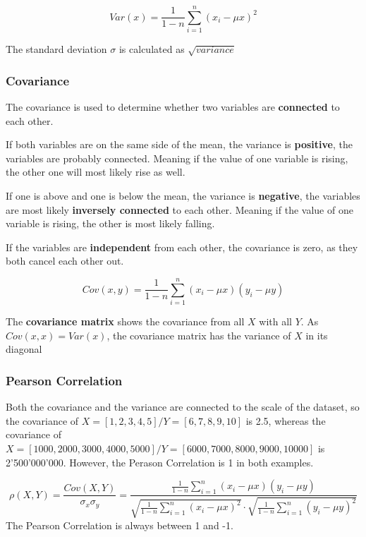 \documentclass[11pt]{article}
\begin{document}
\begin{equation}
    Var(x) = \frac{1}{1-n} \sum^{n}_{i=1}(x_{i} - \mu x)^2
\end{equation}

The standard deviation $\sigma$ is calculated as $\sqrt{variance}$

\newpage

\subsubsection{Covariance} \label{sec:covariance}
The covariance is used to determine whether two variables are \textbf{connected} to each other.

If both variables are on the same side of the mean, the variance is \textbf{positive}, the variables are probably connected. Meaning if the value of one variable is rising, the other one will most likely rise as well.

If one is above and one is below the mean, the variance is \textbf{negative}, the variables are most likely \textbf{inversely connected} to each other. Meaning if the value of one variable is rising, the other is most likely falling.

If the variables are \textbf{independent} from each other, the covariance is zero, as they both cancel each other out.

\begin{equation}
    Cov(x,y) = \frac{1}{1-n} \sum^{n}_{i=1}(x_{i} - \mu x)(y_{i} - \mu y)
\end{equation}

The \textbf{covariance matrix} shows the covariance from all $X$ with all $Y$. As $Cov(x,x) = Var(x)$, the covariance matrix has the variance of $X$ in its diagonal


\subsubsection{Pearson Correlation} \label{sec:pearson}
Both the covariance and the variance are connected to the scale of the dataset, so the covariance of $X=[1,2,3,4,5] / Y=[6,7,8,9,10]$ is 2.5, whereas the covariance of $X=[1000,2000,3000,4000,5000] / Y=[6000,7000,8000,9000,10000]$ is 2'500'000'000. However, the Perason Correlation is 1 in both examples.

\begin{equation}
    \rho(X,Y)=\frac{Cov(X,Y)}{\sigma_{x} \sigma_{y}} =
    \frac{\frac{1}{1-n} \sum^{n}_{i=1}(x_{i} - \mu x)(y_{i} - \mu y)}{\sqrt{\frac{1}{1-n} \sum^{n}_{i=1}(x_{i} - \mu x)^2} \cdot \sqrt{\frac{1}{1-n} \sum^{n}_{i=1}(y_{i} - \mu y)^2}}
\end{equation}
The Pearson Correlation is always between 1 and -1.
\end{document}
